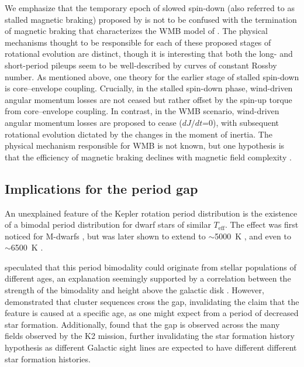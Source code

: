\documentclass[linenumbers,tighten,trackchanges,twocolumn]{aastex631}
\newcommand{\teff}{\ensuremath{T_{\mathrm{eff}}}\xspace}
\begin{document}
We emphasize that the temporary epoch of slowed spin-down (also referred to as stalled magnetic braking) proposed by \citet{Curtis2019a, Curtis2020} is not to be confused with the termination of magnetic braking that characterizes the WMB model of \citet{vanSaders2016, vanSaders2019}. The physical mechanisms thought to be responsible for each of these proposed stages of rotational evolution are distinct, though it is interesting that both the long- and short-period pileups seem to be well-described by curves of constant Rossby number. As mentioned above, one theory for the earlier stage of stalled spin-down is core–envelope coupling. Crucially, in the stalled spin-down phase, wind-driven angular momentum losses are not ceased but rather offset by the spin-up torque from core–envelope coupling. In contrast, in the WMB scenario, wind-driven angular momentum losses are proposed to cease ($dJ/dt$=0), with subsequent rotational evolution dictated by the changes in the moment of inertia. The physical mechanism responsible for WMB is not known, but one hypothesis is that the efficiency of magnetic braking declines with magnetic field complexity \citep[e.g.][]{Reville2015, vanSaders2016, Garraffo2016, Metcalfe2016, Metcalfe2019}.

\subsection{Implications for the period gap} \label{subsec:gap}

An unexplained feature of the Kepler rotation period distribution is the existence of a bimodal period distribution for dwarf stars of similar \teff. The effect was first noticed for M-dwarfs \citep{McQuillan2013b}, but was later shown to extend to $\sim$5000~K \citep{Reinhold2013, McQuillan2014, ReinholdHekker2020}, and even to $\sim$6500~K \citep{Davenport2017}. 

\citet{McQuillan2013b, McQuillan2014} speculated that this period bimodality could originate from stellar populations of different ages, an explanation seemingly supported by a correlation between the strength of the bimodality and height above the galactic disk \citep{DavenportCovey2018}. However, \citet{Curtis2020} demonstrated that cluster sequences cross the gap, invalidating the claim that the feature is caused at a specific age, as one might expect from a period of decreased star formation. Additionally, \citet{Gordon2021} found that the gap is observed across the many fields observed by the K2 mission, further invalidating the star formation history hypothesis as different Galactic sight lines are expected to have different different star formation histories. 
\end{document}
